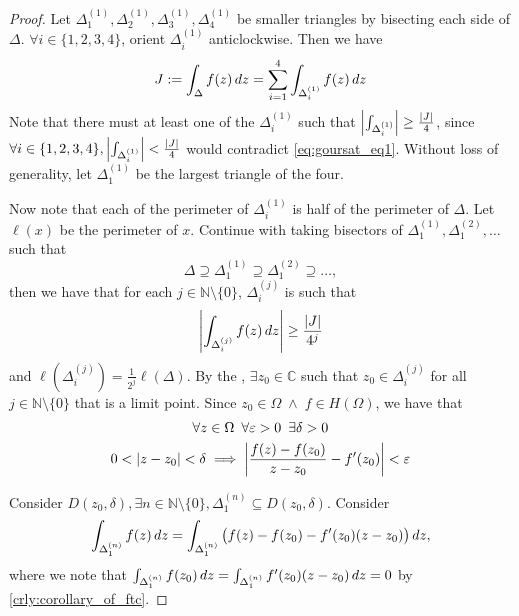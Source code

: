 \documentclass[notoc,notitlepage]{tufte-book}
\begin{document}
\begin{proof}
	Let $\Delta_1^{(1)}, \Delta_2^{(1)}, \Delta_3^{(1)}, \Delta_4^{(1)}$ be smaller triangles by bisecting each side of $\Delta$. $\forall i \in \{1, 2, 3, 4\}$, orient $\Delta_i^{(1)}$ anticlockwise. Then we have
	\begin{equation}\label{eq:goursat_eq1}
		J := \int_{\Delta} f(z) \mathop{}\!d{z} = \sum_{i=1}^{4} \int_{\Delta_i^{(1)}} f(z) \mathop{}\!d{z} 
	\end{equation}
	Note that there must at least one of the $\Delta_i^{(1)}$ such that $\left|\int_{\Delta_i^{(1)}} \right| \geq \frac{\left|J\right|}{4}$, since $\forall i \in \{1, 2, 3, 4\}, \left|\int_{\Delta_i^{(1)}} \right| < \frac{\left|J\right|}{4}$ would contradict \cref{eq:goursat_eq1}. Without loss of generality, let $\Delta_1^{(1)}$ be the largest triangle of the four.

	Now note that each of the perimeter of $\Delta_i^{(1)}$ is half of the perimeter of $\Delta$. Let $\ell(x)$ be the perimeter of $x$. Continue with taking bisectors of $\Delta_1^{(1)}, \Delta_1^{(2)}, \hdots$ such that
	\begin{equation*}
		\Delta \supseteq \Delta_1^{(1)} \supseteq \Delta_1^{(2)} \supseteq \hdots,
	\end{equation*}
	then we have that for each $j \in \mathbb{N} \setminus \{0\}$, $\Delta_i^{(j)}$ is such that
	\begin{equation*}
		\left|\int_{\Delta_i^{(j)}} f(z) \mathop{}\!d{z}\right| \geq \frac{\left|J\right|}{4^j} 
	\end{equation*}
	and $\ell(\Delta_i^{(j)}) = \frac{1}{2^j} \ell (\Delta)$. By the , $\exists z_0 \in \mathbb{C}$ such that $z_0 \in \Delta_i^{(j)}$ for all $j \in \mathbb{N} \setminus \{0\}$ that is a limit point. Since $z_0 \in \Omega \; \land \; f \in H(\Omega)$, we have that
	\begin{gather*}
		\forall z \in \Omega \enspace \forall \varepsilon > 0 \enspace \exists \delta > 0 \\
		0 < \left|z - z_0\right| < \delta \implies \left|\frac{f(z) - f(z_0)}{z - z_0} - f'(z_0)\right| < \varepsilon
	\end{gather*}

	Consider $D(z_0, \delta), \exists n \in \mathbb{N} \setminus \{0\}, \Delta_1^{(n)} \subseteq D(z_0, \delta)$. Consider
	\begin{equation*}
		\int_{\Delta_1^{(n)}} f(z) \mathop{}\!d{z} = \int_{\Delta_1^{(n)}} \big(f(z) - f(z_0) - f'(z_0)(z - z_0)\big) \mathop{}\!d{z},
	\end{equation*}
	where we note that $\int_{\Delta_1^{(n)}} f(z_0) \mathop{}\!d{z} = \int_{\Delta_1^{(n)}} f'(z_0)(z - z_0) \mathop{}\!d{z} = 0$ by \cref{crly:corollary_of_ftc}.


\end{proof}
\end{document}
